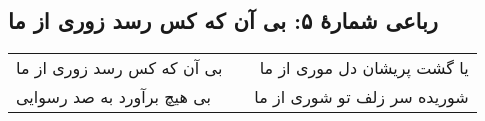 \begin{center}
\section*{رباعی شمارهٔ ۵: بی آن که کس رسد زوری از ما }
\label{sec:005}
\begin{longtable}{l p{0.5cm} r}
بی آن که کس رسد زوری از ما 
&&
یا گشت پریشان دل موری از ما
\\
بی هیچ  برآورد به صد رسوایی
&&
شوریده سر زلف تو شوری از ما
\\
\end{longtable}
\end{center}
